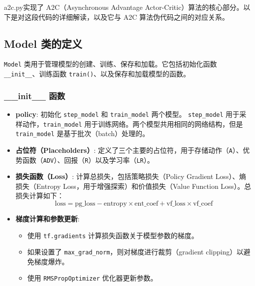\documentclass[twocolumn, 10pt]{article} %
\theoremstyle{remark}
\begin{document}
a2c.py实现了 A2C（Asynchronous Advantage Actor-Critic）算法的核心部分。以下是对这段代码的详细解读，以及它与 A2C 算法伪代码之间的对应关系。

\subsection{Model 类的定义}
\texttt{Model} 类用于管理模型的创建、训练、保存和加载。它包括初始化函数 \texttt{\_\_init\_\_}、训练函数 \texttt{train()}、以及保存和加载模型的函数。

\subsubsection{\_\_init\_\_ 函数}
\begin{itemize}
    \item \textbf{policy}: 初始化 \texttt{step\_model} 和 \texttt{train\_model} 两个模型。 \texttt{step\_model} 用于采样动作，\texttt{train\_model} 用于训练网络。两个模型共用相同的网络结构，但是 \texttt{train\_model} 是基于批次（batch）处理的。
    \item \textbf{占位符（Placeholders）}: 定义了三个主要的占位符，用于存储动作（\texttt{A}）、优势函数（\texttt{ADV}）、回报（\texttt{R}）以及学习率（\texttt{LR}）。
    \item \textbf{损失函数（Loss）}: 计算总损失，包括策略损失（Policy Gradient Loss）、熵损失（Entropy Loss，用于增强探索）和价值损失（Value Function Loss）。总损失计算如下：
    \[
    \text{loss} = \text{pg\_loss} - \text{entropy} \times \text{ent\_coef} + \text{vf\_loss} \times \text{vf\_coef}
    \]
    \item \textbf{梯度计算和参数更新}:
    \begin{itemize}
        \item 使用 \texttt{tf.gradients} 计算损失函数关于模型参数的梯度。
        \item 如果设置了 \texttt{max\_grad\_norm}，则对梯度进行裁剪（gradient clipping）以避免梯度爆炸。
        \item 使用 \texttt{RMSPropOptimizer} 优化器更新参数。
    \end{itemize}
\end{itemize}
\end{document}
